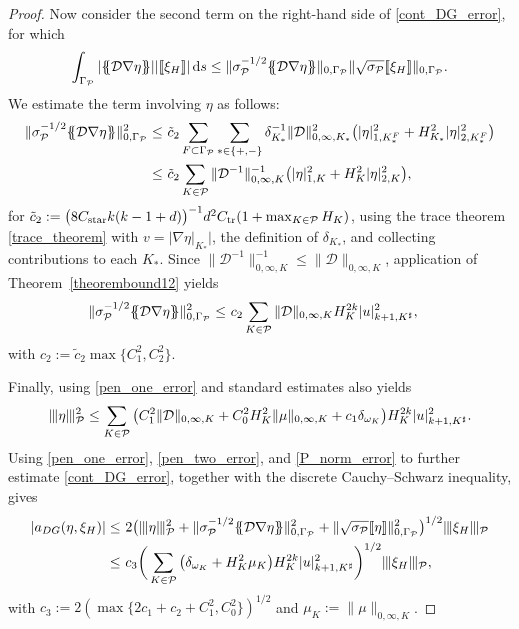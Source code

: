\documentclass[11pt,final]{amsart}
\theoremstyle{plain}
\theoremstyle{definition}
\newcommand\calP{{\mathcal{P}}}
\newcommand{\mesh}{\calP}
\newcommand{\mean}[1]{\{\kern-1.1mm\{#1\}\kern-1.1mm\}}
\newcommand{\jump}[1]{[\![#1]\!]}                        %
\newcommand{\ud}{\,\mathrm{d}}
\newcommand{\ndgp}[1]{| \kern -.25mm \|{#1}| \kern -.25mm \|_{\rm \mesh}}
\newcommand{\norm}[2]{\|{#1}\|_{{#2}}}
\renewcommand{\k}{K}
\newcommand{\ksh}{{K^{\sharp}}}
\begin{document}
\begin{proof}
Now consider the second term on the right-hand side of
\eqref{cont_DG_error}, for which
\[
\int_{\Gamma_\mesh}|\mean{\mathcal{D}\nabla \eta}| |\jump{\xi_H}|\ud s \le \norm{\sigma_\mesh^{-1/2}\mean{\mathcal{D}\nabla \eta}}{0,\Gamma_\mesh}\norm{\sqrt{\sigma_\mesh}\jump{\xi_H}}{0,\Gamma_\mesh}.
\]
We estimate the term involving $\eta$ as follows:
\[
\begin{aligned}
	\norm{\sigma_\mesh^{-1/2}\mean{\mathcal{D}\nabla \eta}}{0,\Gamma_\mesh}^2 
	\le &\ 
\tilde{c}_2	\sum_{F\subset \Gamma_\mesh}\sum_{*\in\{+,-\}}\delta_{\k_*}^{-1}\norm{\mathcal{D}}{0,\infty,\k_*}^2\big( |\eta|_{1,\k_*^F}^2+H_{\k_*}^2 |\eta|_{2,\k_*^F}^2\big)\\
	\le &\ 
\tilde{c}_2	\sum_{\k\in\mesh}\norm{\mathcal{D}^{-1}}{0,\infty,\k}^{-1}\big( |\eta|_{1,\k}^2+H_{\k}^2 |\eta|_{2,\k}^2\big),
\end{aligned}
\]
for $\tilde{c}_2:=\big(8C_{\rm star}k(k-1+d)\big)^{-1}d^2 C_{\rm
  tr}(1+\max_{\k\in\mesh}H_\k)$, using the trace theorem
\eqref{trace_theorem} with $v=|\nabla \eta|_{\k_*}|$, the definition
of $\delta_{\k_*}$, and collecting contributions to each $\k_*$. Since
$\norm{\mathcal{D}^{-1}}{0,\infty,\k}^{-1}\le
\norm{\mathcal{D}}{0,\infty,\k}$, application of
Theorem~\ref{theorembound12} yields
\begin{equation}\label{pen_two_error}
\begin{aligned}
	\norm{\sigma_\mesh^{-1/2}\mean{\mathcal{D}\nabla \eta}}{0,\Gamma_\mesh}^2 
	\le &\ 
	c_2	\sum_{\k\in\mesh}\norm{\mathcal{D}}{0,\infty,\k}H_{\k}^{2k} |u|_{k+1,\ksh}^2,  
\end{aligned}
\end{equation}
with $c_2:=\tilde{c}_2\max\{C_1^2,C_2^2\}$.

Finally, using \eqref{pen_one_error} and standard estimates also yields
\begin{equation}\label{P_norm_error}
	\ndgp{\eta}^2\le \sum_{\k\in\mesh}\big(C_1^2 \norm{\mathcal{D}}{0,\infty,\k}+C_0^2 H_\k^2\|\mu\|_{0,\infty,\k}+c_1\delta_{\omega_\k}\big)H_{\k}^{2k} |u|_{k+1,\ksh}^2.
\end{equation}
Using \eqref{pen_one_error}, \eqref{pen_two_error}, and
\eqref{P_norm_error} to further estimate \eqref{cont_DG_error}, together
with the discrete Cauchy--Schwarz inequality, gives
\begin{equation}\label{error_xi_H}
  \begin{aligned}
    |a_{DG}(\eta,\xi_H)|
    \le &\
    2\big(
    \ndgp{\eta}^2
    +	\norm{\sigma_\mesh^{-1/2}\mean{\mathcal{D}\nabla \eta}}{0,\Gamma_\mesh}^2  
    +  \norm{\sqrt{\sigma_\mesh}\jump{\eta}}{0,\Gamma_\mesh}^2
    \big)^{1/2} \ndgp{\xi_H}\\
    \le&\ c_3\bigg(\sum_{\k\in\mesh}\big(\delta_{\omega_\k}+ H_\k^2\mu_\k\big)
    H_{\k}^{2k} |u|_{k+1,\ksh}^2\bigg)^{1/2} \ndgp{\xi_H},
  \end{aligned}
\end{equation}
with $c_3:=2(\max\{2c_1+c_2+C_1^2, C_0^2\})^{1/2}$ and
$\mu_\k:=\|\mu\|_{0,\infty,\k}$.


\end{proof}
\end{document}
